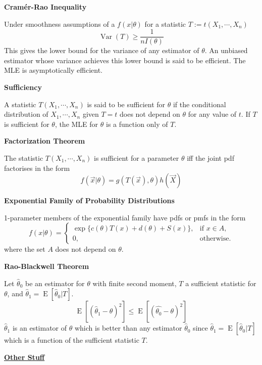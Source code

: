 \documentclass[a4paper]{article}
\newcommand{\heading}[1]{{\small\underline{\textbf{#1}}}\smallskip}
\newcommand{\subheading}[1]{{\scriptsize\textbf{#1}}}
\renewenvironment{section}[1]
  {
    \subheading{#1}

  }{
    \smallskip
  }
\newcommand{\expectation}[1]{\operatorname{E}[#1]}
\DeclareMathOperator{\Var}{Var}
\begin{document}
\begin{multicols*}{4}
\begin{section}{Cram\'er-Rao Inequality}
  Under smoothness assumptions of a $f(x|\theta)$ for a statistic $T:=t(X_1,
  \cdots, X_n)$
  $$\Var(T) \geq \frac{1}{nI(\theta)}$$
  This gives the lower bound for the variance of any estimator of $\theta$. An
  unbiased estimator whose variance achieves this lower bound is said to be
  efficient. The MLE is asymptotically efficient.
\end{section}

\begin{section}{Sufficiency}
  A statistic $T(X_1, \cdots, X_n)$ is said to be sufficient for $\theta$ if the
  conditional distribution of $X_1, \cdots, X_n$ given $T=t$ does not depend on
  $\theta$ for any value of $t$. If $T$ is sufficient for $\theta$, the MLE for
  $\theta$ is a function only of $T$.
\end{section}

\begin{section}{Factorization Theorem}
  The statistic $T(X_1, \cdots, X_n)$ is sufficient for a parameter $\theta$ iff
  the joint pdf factorises in the form
  $$f(\vec{x}|\theta) = g(T(\vec{x}), \theta)h(\vec{X})$$
\end{section}

\begin{section}{Exponential Family of Probability Distributions}
  1-parameter members of the exponential family have pdfs or pmfs in the form
  $$f(x|\theta) = \begin{cases}
      \exp\{c(\theta)T(x)+d(\theta)+S(x)\}, & \text{if } x \in A, \\
      0, & \text{otherwise.}
  \end{cases}$$
  where the set $A$ does not depend on $\theta$.
\end{section}

\begin{section}{Rao-Blackwell Theorem}
  Let $\hat{\theta}_0$ be an estimator for $\theta$ with finite second moment,
  $T$ a sufficient statistic for $\theta$, and $\hat{\theta}_1 =
  \expectation{\hat{\theta}_0|T}$.
  $$\expectation{(\hat{\theta}_1-\theta)^2} \leq
    \expectation{(\hat{\theta_0}-\theta)^2}$$
  $\hat{\theta}_1$ is an estimator of $\theta$ which is better than any
  estimator $\hat{\theta}_0$ since
  $\hat{\theta}_1=\expectation{\hat{\theta}_0|T}$ which is a function of the
  sufficient statistic $T$.
\end{section}

\heading{Other Stuff}


\end{multicols*}
\end{document}
